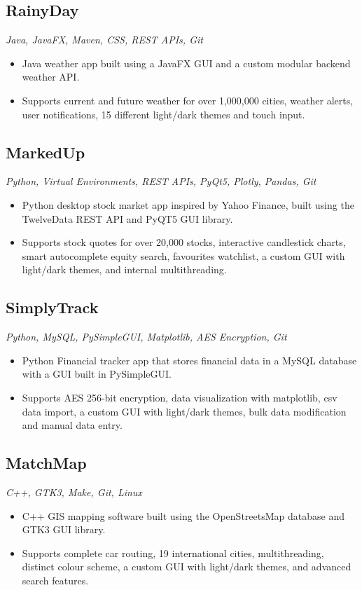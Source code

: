 \documentclass[10pt, a4paper]{article}
\begin{document}
\subsection*{RainyDay}
\textit{Java, JavaFX, Maven, CSS, REST APIs, Git}
\begin{itemize}
    \item Java weather app built using a JavaFX GUI and a custom modular backend weather API.
    \item Supports current and future weather for over 1,000,000 cities, weather alerts, user notifications, 15 different light/dark themes and touch input.
\end{itemize}

\subsection*{MarkedUp}
\textit{Python, Virtual Environments, REST APIs, PyQt5, Plotly, Pandas, Git}
\begin{itemize}
    \item Python desktop stock market app inspired by Yahoo Finance, built using the TwelveData REST API and PyQT5 GUI library.
    \item Supports stock quotes for over 20,000 stocks, interactive candlestick charts, smart autocomplete equity search, favourites watchlist, a custom GUI with light/dark themes, and internal multithreading.
\end{itemize}

\subsection*{SimplyTrack}
\textit{Python, MySQL, PySimpleGUI, Matplotlib, AES Encryption, Git}
\begin{itemize}
    \item Python Financial tracker app that stores financial data in a MySQL database with a GUI built in PySimpleGUI.
    \item Supports AES 256-bit encryption, data visualization with matplotlib, csv data import, a custom GUI with light/dark themes, bulk data modification and manual data entry.
\end{itemize}

\subsection*{MatchMap}
\textit{C++, GTK3, Make, Git, Linux}
\begin{itemize}
    \item C++ GIS mapping software built using the OpenStreetsMap database and GTK3 GUI library.
    \item Supports complete car routing, 19 international cities, multithreading, distinct colour scheme, a custom GUI with light/dark themes, and advanced search features.
\end{itemize}
\end{document}
